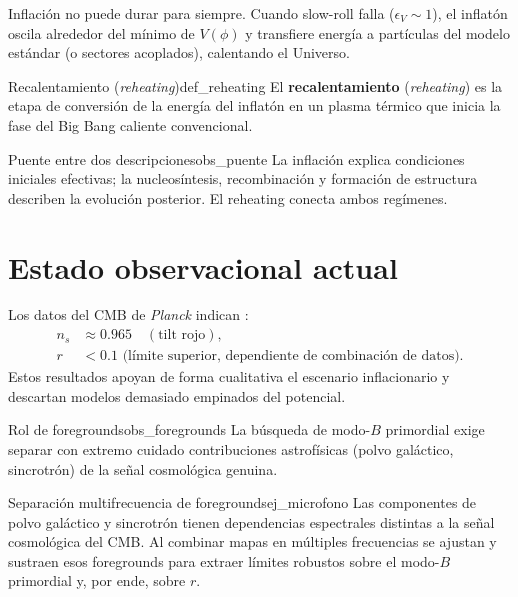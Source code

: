 Inflación no puede durar para siempre. Cuando slow-roll falla ($\epsilon_V\sim1$), el inflatón oscila alrededor del mínimo de $V(\phi)$ y transfiere energía a partículas del modelo estándar (o sectores acoplados), calentando el Universo.

\begin{definicion}{Recalentamiento (\emph{reheating})}{def_reheating}
El \textbf{recalentamiento} (\emph{reheating}) es la etapa de conversión de la energía del inflatón en un plasma térmico que inicia la fase del Big Bang caliente convencional.
\end{definicion}

\begin{observacion}{Puente entre dos descripciones}{obs_puente}
La inflación explica condiciones iniciales efectivas; la nucleosíntesis, recombinación y formación de estructura describen la evolución posterior. El reheating conecta ambos regímenes.
\end{observacion}

\section{Estado observacional actual}
\label{sec:obs_inflacion}

Los datos del CMB de \textit{Planck} indican \cite{Planck2020}:
\begin{align}
  n_s &\approx 0.965 \quad (\text{tilt rojo}),\\
  r &< 0.1 \text{ (límite superior, dependiente de combinación de datos)}.
\end{align}
Estos resultados apoyan de forma cualitativa el escenario inflacionario y descartan modelos demasiado empinados del potencial.

\begin{observacion}{Rol de foregrounds}{obs_foregrounds}
La búsqueda de modo-$B$ primordial exige separar con extremo cuidado contribuciones astrofísicas (polvo galáctico, sincrotrón) de la señal cosmológica genuina.
\end{observacion}

\begin{ejemplo}{Separación multifrecuencia de foregrounds}{ej_microfono}
Las componentes de polvo galáctico y sincrotrón tienen dependencias espectrales distintas a la señal cosmológica del CMB. Al combinar mapas en múltiples frecuencias se ajustan y sustraen esos foregrounds para extraer límites robustos sobre el modo-$B$ primordial y, por ende, sobre $r$.
\end{ejemplo}

